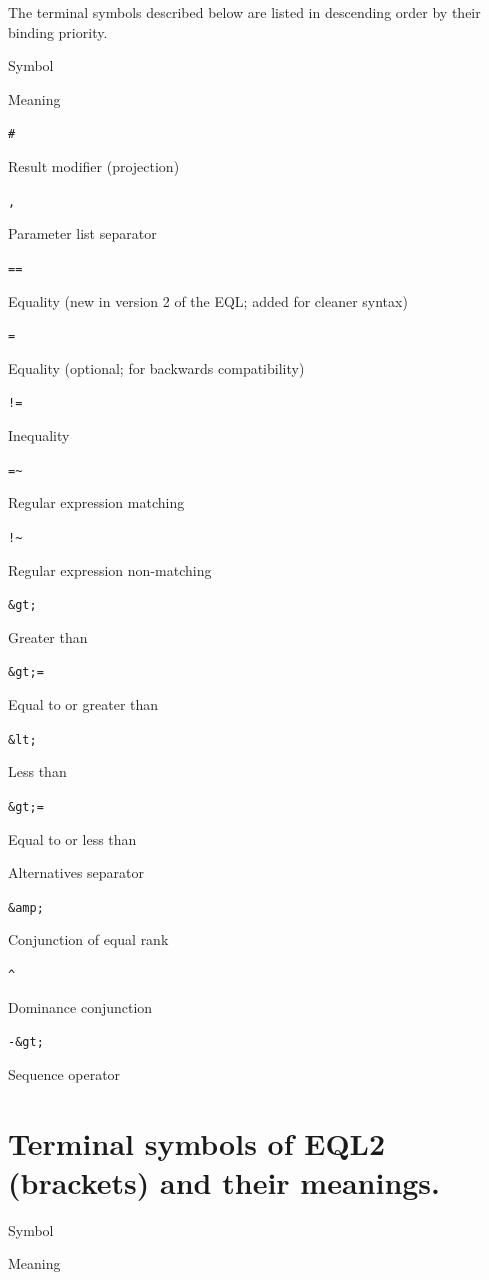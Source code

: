 \documentclass[]{book}
\begin{document}
The terminal symbols described below are listed in descending order by their binding priority.

Symbol

Meaning

\texttt{\#}

Result modifier (projection)

\texttt{,}

Parameter list separator

\texttt{==}

Equality (new in version 2 of the EQL; added for cleaner syntax)

\texttt{=}

Equality (optional; for backwards compatibility)

\texttt{!=}

Inequality

\texttt{=\textasciitilde{}}

Regular expression matching

\texttt{!\textasciitilde{}}

Regular expression non-matching

\texttt{\&gt;}

Greater than

\texttt{\&gt;=}

Equal to or greater than

\texttt{\&lt;}

Less than

\texttt{\&gt;=}

Equal to or less than

\texttt{\textbar{}}

Alternatives separator

\texttt{\&amp;}

Conjunction of equal rank

\texttt{\^{}}

Dominance conjunction

\texttt{-\&gt;}

Sequence operator

\hypertarget{terminal-symbols-of-eql2-brackets-and-their-meanings.}{%
\section{Terminal symbols of EQL2 (brackets) and their meanings.}\label{terminal-symbols-of-eql2-brackets-and-their-meanings.}}

Symbol

Meaning

\texttt{\textquotesingle{}}
\end{document}
